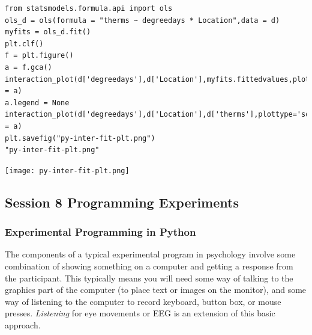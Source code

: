 \documentclass{article}
\begin{document}
\begin{enumerate}
\begin{verbatim}
from statsmodels.formula.api import ols
ols_d = ols(formula = "therms ~ degreedays * Location",data = d)
myfits = ols_d.fit()
plt.clf()
f = plt.figure()
a = f.gca()
interaction_plot(d['degreedays'],d['Location'],myfits.fittedvalues,plottype="line",ax = a)
a.legend = None
interaction_plot(d['degreedays'],d['Location'],d['therms'],plottype='scatter',ax = a)
plt.savefig("py-inter-fit-plt.png")
"py-inter-fit-plt.png"
\end{verbatim}

\begin{center}
\texttt{[image: py-inter-fit-plt.png]}
\end{center}
\end{enumerate}
\subsection{Session 8 Programming Experiments}
\label{sec:org4ae2a0b}
\subsubsection{Experimental Programming in Python}
\label{sec:orgf41d4ae}
The components of a typical experimental program in psychology involve some combination of showing something on a computer and getting a response from the participant. This typically means you will need some way of talking to the graphics part of the computer (to place text or images on the monitor), and some way of listening to the computer to record keyboard, button box, or mouse presses. \emph{Listening} for eye movements or EEG is an extension of this basic approach. 
\end{document}
